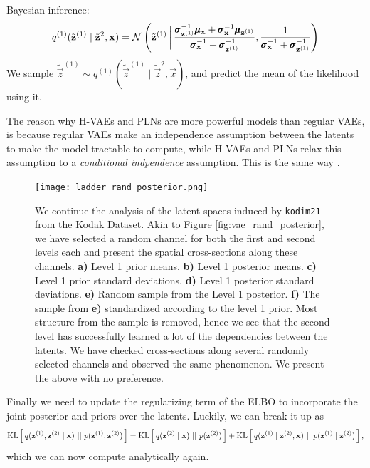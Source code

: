 Bayesian inference\footnotemark:
\[
  q^{(1)}(\tilde{\mathbf{z}}^{(1)} \mid \tilde{\mathbf{z}}^{2}, \mathbf{x}) =
  \mathcal{N}\left( \tilde{\mathbf{z}}^{(1)} \,\bigg|\,
    \frac{\pmb{\sigma}_{\mathbf{z}^{(1)}}^{-1} \pmb{\mu}_{\mathbf{x}} + \pmb{\sigma}_{\mathbf{x}}^{-1}
      \pmb{\mu}_{\mathbf{z}^{(1)}}}{\pmb{\sigma}_{\mathbf{x}}^{-1} + \pmb{\sigma}_{\mathbf{z}^{(1)}}^{-1}
    },
  \frac{1}{\pmb{\sigma}_{\mathbf{x}}^{-1} + \pmb{\sigma}_{\mathbf{z}^{(1)}}^{-1} } \right)
\]
We sample $\tilde{\vec{z}}^{(1)} \sim q^{(1)}(\tilde{\vec{z}}^{(1)} \mid
\tilde{\vec{z}}^{2}, \vec{x})$, and predict the mean of the likelihood using it.
\par 
The reason why H-VAEs and PLNs are more powerful models than regular VAEs, is
because regular VAEs make an independence assumption between the latents to make
the model tractable to compute, while H-VAEs and PLNs relax this assumption to a
\textit{conditional indpendence} assumption. This is the same way
\cite{balle2018variational}.

\begin{figure}
  \centering
  \texttt{[image: ladder\_rand\_posterior.png]}
  \caption{We continue the analysis of the latent spaces induced by
    \texttt{kodim21} from the Kodak Dataset. Akin to Figure
    \ref{fig:vae_rand_posterior}, we have selected a random channel for both the
    first and second levels each and present the spatial cross-sections along these
    channels. \textbf{a)} Level 1 prior means. \textbf{b)} Level 1 posterior means.
    \textbf{c)} Level 1 prior standard deviations. \textbf{d)} Level 1 posterior
    standard deviations. \textbf{e)} Random sample from the Level 1 posterior.
    \textbf{f)} The sample from \textbf{e)} standardized according to the level
    1 prior. Most structure from the sample is removed, hence we see that the
    second level has successfully learned a lot of the dependencies between the
    latents. We have checked cross-sections along several randomly selected
    channels and observed the same phenomenon. We present the above with no preference.}
  \label{fig:ladder_rand_posterior}
\end{figure}

\par
Finally we need to update the regularizing term of the ELBO to incorporate the
joint posterior and priors over the latents. Luckily, we can break it up as
\[
  \mathrm{KL}\left[\,q(\mathbf{z}^{(1)}, \mathbf{z}^{(2)} \mid \mathbf{x})\,\,||\,\,p(\mathbf{z}^{(1)}, \mathbf{z}^{(2)})\,\right] = 
  \mathrm{KL}\left[\,q(\mathbf{z}^{(2)} \mid \mathbf{x})\,\,||\,\,p(\mathbf{z}^{(2)})\,\right] + 
  \mathrm{KL}\left[\,q(\mathbf{z}^{(1)} \mid \mathbf{z}^{(2)} , \mathbf{x})\,\,||\,\,p(\mathbf{z}^{(1)} \mid \mathbf{z}^{(2)})\,\right],
\]
which we can now compute analytically again.

